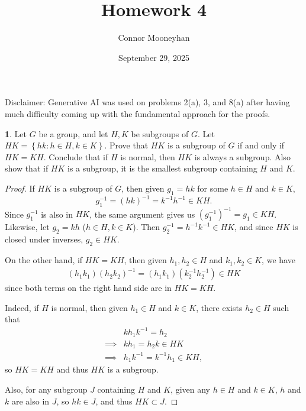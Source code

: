 \documentclass[12pt]{article}
\title{Homework 4}
\author{Connor Mooneyhan}
\date{September 29, 2025}
\theoremstyle{definition}
\newtheorem{ex}{}
\begin{document}
\maketitle

Disclaimer: Generative AI was used on problems 2(a), 3, and 8(a) after having much difficulty coming up with the fundamental approach for the proofs.

\begin{ex}
	Let $G$ be a group, and let $H, K$ be subgroups of $G$.
	Let $HK = \left\lbrace hk : h \in H, k \in K \right\rbrace$.
	Prove that $HK$ is a subgroup of $G$ if and only if $HK = KH$.
	Conclude that if $H$ is normal, then $HK$ is always a subgroup.
	Also show that if $HK$ is a subgroup, it is the smallest subgroup containing $H$ and $K$.
\end{ex}
\begin{proof}
	If $HK$ is a subgroup of $G$, then given $g_1 = hk$ for some $h \in H$ and $k \in K$, \begin{equation*}
		g_1^{-1} = (hk)^{-1} = k^{-1}h^{-1} \in KH.
	\end{equation*}
	Since $g_1^{-1}$ is also in $HK$, the same argument gives us $(g_1^{-1})^{-1} = g_1 \in KH$.
	Likewise, let $g_2 = kh$ ($h \in H, k \in K$).
	Then $g_2^{-1} = h^{-1}k^{-1} \in HK$, and since $HK$ is closed under inverses, $g_2 \in HK$.

	On the other hand, if $HK = KH$, then given $h_1,h_2 \in H$ and $k_1,k_2 \in K$, we have \begin{align*}
		(h_1k_1)(h_2k_2)^{-1} = (h_1k_1)(k_2^{-1}h_2^{-1}) \in HK
	\end{align*}
	since both terms on the right hand side are in $HK = KH$.

	Indeed, if $H$ is normal, then given $h_1 \in H$ and $k \in K$, there exists $h_2 \in H$ such that \begin{align*}
		         & kh_1k^{-1} = h_2              \\
		\implies & kh_1 = h_2k \in HK            \\
		\implies & h_1k^{-1} = k^{-1}h_1 \in KH,
	\end{align*}
	so $HK = KH$ and thus $HK$ is a subgroup.

	Also, for any subgroup $J$ containing $H$ and $K$, given any $h \in H$ and $k \in K$, $h$ and $k$ are also in $J$, so $hk \in J$, and thus $HK \subset J$.
\end{proof}
\end{document}
